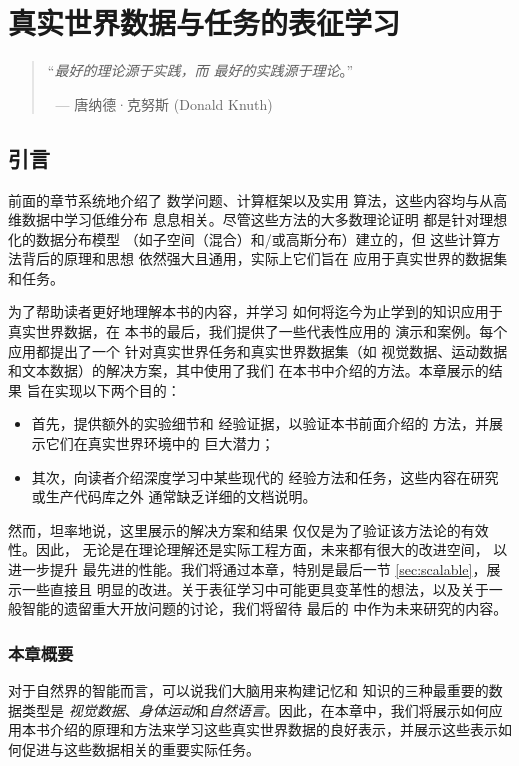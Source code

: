\documentclass[../../book-main_zh.tex]{subfiles}
\begin{document}
\chapter{真实世界数据与任务的表征学习}
\label{ch:applications}

\begin{quote}
    \hfill    ``{\em 最好的理论源于实践，而
    最好的实践源于理论}。''

    $~$ \hfill --- 唐纳德·克努斯 (Donald Knuth)
\end{quote}
\vspace{5mm}

\section{引言}
前面的章节系统地介绍了
数学问题、计算框架以及实用
算法，这些内容均与从高维数据中学习低维分布
息息相关。尽管这些方法的大多数理论证明
都是针对理想化的数据分布模型
（如子空间（混合）和/或高斯分布）建立的，但
这些计算方法背后的原理和思想
依然强大且通用，实际上它们旨在
应用于真实世界的数据集和任务。

为了帮助读者更好地理解本书的内容，并学习
如何将迄今为止学到的知识应用于真实世界数据，在
本书的最后，我们提供了一些代表性应用的
演示和案例。每个应用都提出了一个
针对真实世界任务和真实世界数据集（如
视觉数据、运动数据和文本数据）的解决方案，其中使用了我们
在本书中介绍的方法。本章展示的结果
旨在实现以下两个目的：
\begin{itemize}
    \item 首先，提供额外的实验细节和
        经验证据，以验证本书前面介绍的
        方法，并展示它们在真实世界环境中的
        巨大潜力；
    \item 其次，向读者介绍深度学习中某些现代的
        经验方法和任务，这些内容在研究或生产代码库之外
        通常缺乏详细的文档说明。
\end{itemize}
然而，坦率地说，这里展示的解决方案和结果
仅仅是为了验证该方法论的有效性。因此，
无论是在理论理解还是实际工程方面，未来都有很大的改进空间，
以进一步提升
最先进的性能。我们将通过本章，特别是最后一节 \ref{sec:scalable}，展示一些直接且
明显的改进。关于表征学习中可能更具变革性的想法，以及关于一般智能的遗留重大开放问题的讨论，我们将留待
最后的  中作为未来研究的内容。

\subsection{本章概要}
\label{sec:application_outline}
对于自然界的智能而言，可以说我们大脑用来构建记忆和
知识的三种最重要的数据类型是
{\em 视觉数据}、{\em 身体运动}和{\em 自然语言}。因此，在本章中，我们将展示如何应用本书介绍的原理和方法来学习这些真实世界数据的良好表示，并展示这些表示如何促进与这些数据相关的重要实际任务。
\end{document}
